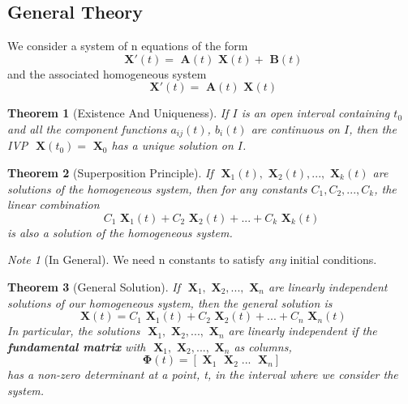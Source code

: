 \documentclass[12pt]{article}
\newtheorem{thm}{Theorem}[section]
\theoremstyle{definition}
\theoremstyle{remark}
\newtheorem*{note}{Note} %
\numberwithin{equation}{section}
\newcommand\B[1]{\textbf{ #1}}
\begin{document}
\vspace{1cm}

\subsection{General Theory}


We consider a system of n equations of the form \begin{equation}
        \B{X}'(t) = \B{A}(t)\B{X}(t)+\B{B}(t) 
\end{equation}
and the associated homogeneous system \begin{equation}
        \B{X}'(t) = \B{A}(t)\B{X}(t) 
\end{equation}

\vspace{1cm}


\begin{thm}[Existence And Uniqueness]
        If $I$ is an open interval containing $t_0$ and all the component functions $a_{ij}(t)$, $b_i(t)$ are continuous on $I$, then the IVP $\B{X}(t_0) = \B{X}_0$ has a unique solution on $I$.
\end{thm}


\vspace{1cm}


\begin{thm}[Superposition Principle]
        If $\B{X}_1(t), \B{X}_2(t),...,\B{X}_k(t)$ are solutions of the homogeneous system, then for any constants $C_1,C_2,...,C_k$, the linear combination \begin{equation}
                C_1\B{X}_1(t)+ C_2\B{X}_2(t)+...+C_k\B{X}_k(t)
        \end{equation}
        is also a solution of the homogeneous system.
\end{thm}

\begin{note}[In General]
        We need n constants to satisfy \emph{any} initial conditions.
\end{note}

\vspace{1cm}

\begin{thm}[General Solution]
        If $\B{X}_1,\B{X}_2,...,\B{X}_n$ are linearly independent solutions of our homogeneous system, then the general solution is \begin{equation}
                \B{X}(t) = C_1\B{X}_1(t)+C_2\B{X}_2(t)+...+C_n\B{X}_n(t)
        \end{equation}
        In particular, the solutions $\B{X}_1,\B{X}_2,...,\B{X}_n$ are linearly independent if the \B{fundamental matrix} with $\B{X}_1,\B{X}_2,...,\B{X}_n$ as columns, \begin{equation}
                \boldsymbol{\Phi}(t) = \left[\B{X}_1\;\B{X}_2\;...\;\B{X}_n\right]
        \end{equation}
        has a non-zero determinant at a point, t, in the interval where we consider the system.
\end{thm}
\end{document}
